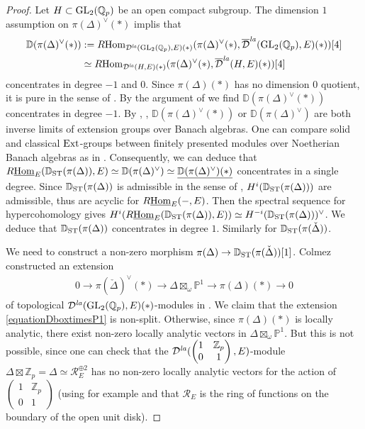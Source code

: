 \documentclass[a4paper,10pt]{amsart}
\theoremstyle{remark}
\theoremstyle{definition}
\theoremstyle{plain}
\numberwithin{equation}{section}
\newcommand{\bbD}{{\mathbb D}}
\newcommand{\bbP}{{\mathbb P}}
\newcommand{\bbQ}{{\mathbb Q}}
\newcommand{\bbZ}{{\mathbb Z}}
\newcommand{\calD}{{\mathcal D}}
\newcommand{\calR}{{\mathcal R}}
\newcommand{\Ext}{{\rm Ext}}
\newcommand{\GL}{{\rm GL}}
\newcommand{\Hom}{{\rm Hom}}
\newcommand{\uHom}{\underline{\Hom}}
\newcommand{\la}{{\it la}}
\newcommand{\ST}{{\rm ST}}
\begin{document}
\begin{proof}
	Let $H\subset \GL_2(\bbQ_p)$ be an open compact subgroup. The dimension $1$ assumption on $\pi(\Delta)^{\vee}(*)$ implis that 
	\begin{align*}
		\bbD(\pi(\Delta)^{\vee}(*))&:=R\Hom_{\calD^{\la}(\GL_2(\bbQ_p),E)(*)}( \pi(\Delta)^{\vee}(*), \overline{\calD}^{\la}(\GL_2(\bbQ_p),E)(*))[4]\\
		&\simeq R\Hom_{\calD^{\la}(H,E)(*)}( \pi(\Delta)^{\vee}(*), \overline{\calD}^{\la}(H,E)(*))[4]	
	\end{align*}
	concentrates in degree $-1$ and $0$. Since $\pi(\Delta)(*)$ has no dimension $0$ quotient, it is pure in the sense of \cite[Prop.~8.7]{ST03}. By the argument of \cite[Lem.~6.2]{huWang2024quaternion} we find $\bbD(\pi(\Delta)^{\vee}(*))$ concentrates in degree $-1$. By \cite[Lem.~8.4]{ST03}, \cite[Rem.~4.2.8]{JC23}, $\bbD(\pi(\Delta)^{\vee}(*))$ or $\bbD(\pi(\Delta)^{\vee})$ are both inverse limits of extension groups over Banach algebras. One can compare solid and classical $\Ext$-groups between finitely presented modules over Noetherian Banach algebras as in \cite[\S~5.4]{bode2026sixoperations}. Consequently, we can deduce that $R\uHom_E(\bbD_{\ST}(\pi(\Delta)),E)\simeq \bbD(\pi(\Delta)^{\vee})\simeq \underline{\bbD(\pi(\Delta)^{\vee})(*)}$ concentrates in a single degree. Since $\bbD_{\ST}(\pi(\Delta))$ is admissible in the sense of \cite[Def.~4.2.1]{JC23}, $H^i(\bbD_{\ST}(\pi(\Delta)))$ are admissible, thus are acyclic for $R\uHom_{E}(-,E) $\cite[Lem.~3.27]{rodrigues2022solid}. Then the spectral sequence for hypercohomology gives $H^i(R\uHom_E(\bbD_{\ST}(\pi(\Delta)),E))\simeq H^{-i}(\bbD_{\ST}(\pi(\Delta)))^{\vee}$. We deduce that $\bbD_{\ST}(\pi(\Delta))$ concentrates in degree $1$. Similarly for $\bbD_{\ST}(\pi(\check\Delta))$. 

	We need to construct a non-zero morphism $\pi(\Delta)\rightarrow \bbD_{\ST}(\pi(\check\Delta))[1]$. Colmez constructed an extension 
	\begin{align}\label{equationDboxtimesP1}
		0\rightarrow \pi(\check\Delta)^{\vee}(*)\rightarrow \Delta\boxtimes_{\omega} \bbP^1\rightarrow \pi(\Delta)(*)\rightarrow  0
	\end{align}
	of topological $\calD^{\la}(\GL_2(\bbQ_p),E)(*)$-modules in \cite[Thm.~0.1]{colmez2016representations}. We claim that the extension \eqref{equationDboxtimesP1} is non-split. Otherwise, since $\pi(\Delta)(*)$ is locally analytic, there exist non-zero locally analytic vectors in $\Delta\boxtimes_{\omega} \bbP^1$. But this is not possible, since one can check that the $\calD^{\la}(\begin{pmatrix}
		1 & \bbZ_p \\ 0 & 1 \end{pmatrix},E)$-module $\Delta\boxtimes \bbZ_p=\Delta\simeq \calR_E^{\oplus 2}$ has no non-zero locally analytic vectors for the action of $\begin{pmatrix}
		1 & \bbZ_p \\ 0 & 1 \end{pmatrix}$ (using for example \cite[Thm.~4.1.5]{JC23} and that $\calR_E$ is the ring of functions on the boundary of the open unit disk).


\end{proof}
\end{document}
